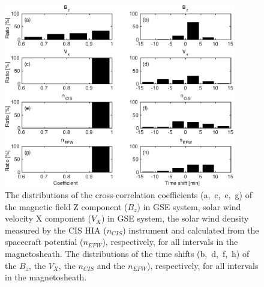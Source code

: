 \documentclass[draft]{agujournal2019}
\begin{document}
\pagebreak

\begin{figure}[h]
\centering
\includegraphics[width=0.9\textwidth,angle=0]{swe-2021sw002807-f10}
\caption{The distributions of the cross-correlation coefficients (a,~c,~e,~g) of the magnetic field Z component ($B_z$) in GSE system, solar wind velocity X component ($V_X$) in GSE system, the solar wind density measured by the CIS HIA ($n_{CIS}$) instrument and calculated from the spacecraft potential ($n_{EFW}$), respectively, for all intervals in the magnetosheath. The distributions of the time shifts (b,~d,~f,~h) of the $B_z$, the $V_X$, the $n_{CIS}$ and the $n_{EFW}$), respectively, for all intervals in the magnetosheath.}
\label{fig:mshcorrplot}
\end{figure}

\pagebreak
\end{document}
